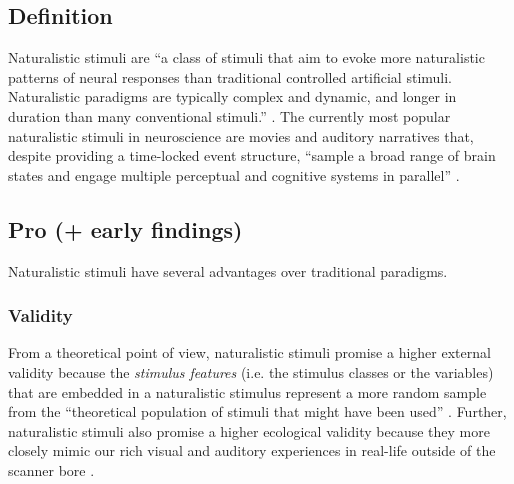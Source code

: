 \subsection{Definition}
Naturalistic stimuli are ``a class of stimuli that aim to evoke more
naturalistic patterns of neural responses than traditional controlled artificial
stimuli. Naturalistic paradigms are typically complex and dynamic, and longer in
duration than many conventional stimuli.'' \citep{vanderwal2019movies}.
The currently most popular naturalistic stimuli in neuroscience are movies and
auditory narratives \citep[s.][for reviews]{jaaskelainen2021movies,
jaaskelainen2020neural} that, despite providing a time-locked event structure,
``sample a broad range of brain states and engage multiple perceptual and
cognitive systems in parallel'' \citep{haxby2020naturalistic}.


\subsection{Pro (+ early findings)}
%
Naturalistic stimuli have several advantages over traditional paradigms.


\subsubsection{Validity}

From a theoretical point of view, naturalistic stimuli promise a higher external
validity because the \textit{stimulus features} (i.e. the stimulus classes or
the variables) that are embedded in a naturalistic stimulus represent a more
random sample from the ``theoretical population of stimuli that might have been
used'' \citep{westfall2016fixing}.
Further, naturalistic stimuli also promise a higher ecological validity
\citep{zaki2009need, hasson2012future, hamilton2018revolution} because they more
closely mimic our rich visual and auditory experiences in real-life outside of
the scanner bore \citep{hasson2008neurocinematics, haxby2020naturalistic}.

